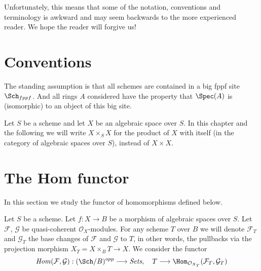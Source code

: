 \medskip\noindent
Unfortunately, this means that some of the notation, conventions and
terminology is awkward and may seem backwards to the more experienced
reader. We hope the reader will forgive us!





\section{Conventions}
\label{section-conventions}

\noindent
The standing assumption is that all schemes are contained in
a big fppf site $\Sch_{fppf}$. And all rings $A$ considered
have the property that $\Spec(A)$ is (isomorphic) to an
object of this big site.

\medskip\noindent
Let $S$ be a scheme and let $X$ be an algebraic space over $S$.
In this chapter and the following we will write $X \times_S X$
for the product of $X$ with itself (in the category of algebraic
spaces over $S$), instead of $X \times X$.















\section{The Hom functor}
\label{section-hom}

\noindent
In this section we study the functor of homomorphisms defined below.

\begin{situation}
\label{situation-hom}
Let $S$ be a scheme. Let $f : X \to B$ be a morphism of algebraic spaces
over $S$. Let $\mathcal{F}$, $\mathcal{G}$ be quasi-coherent
$\mathcal{O}_X$-modules. For any scheme $T$ over $B$ we will denote
$\mathcal{F}_T$ and $\mathcal{G}_T$ the base changes of
$\mathcal{F}$ and $\mathcal{G}$ to $T$, in other words, the pullbacks
via the projection morphism $X_T = X \times_B T \to X$.
We consider the functor
\begin{equation}
\label{equation-hom}
\mathit{Hom}(\mathcal{F}, \mathcal{G}) :
(\Sch/B)^{opp}
\longrightarrow
\textit{Sets},\quad
T
\longrightarrow
\Hom_{\mathcal{O}_{X_T}}(\mathcal{F}_T, \mathcal{G}_T)
\end{equation}
\end{situation}

